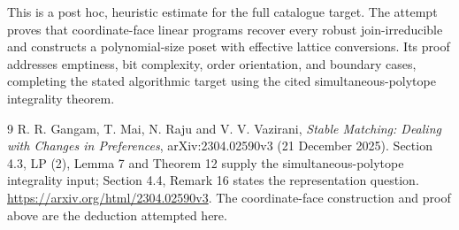 \documentclass[11pt,a4paper]{article}
\begin{document}
This is a post hoc, heuristic estimate for the full catalogue target.
The attempt proves that coordinate-face linear programs recover every robust join-irreducible and constructs a polynomial-size poset with effective lattice conversions. Its proof addresses emptiness, bit complexity, order orientation, and boundary cases, completing the stated algorithmic target using the cited simultaneous-polytope integrality theorem.

\begin{thebibliography}{9}
 R. R. Gangam, T. Mai, N. Raju and V. V. Vazirani, \emph{Stable Matching: Dealing with Changes in Preferences}, arXiv:2304.02590v3 (21 December 2025). Section 4.3, LP (2), Lemma 7 and Theorem 12 supply the simultaneous-polytope integrality input; Section 4.4, Remark 16 states the representation question. \url{https://arxiv.org/html/2304.02590v3}. The coordinate-face construction and proof above are the deduction attempted here.
\end{thebibliography}
\end{document}
